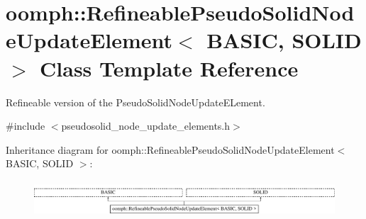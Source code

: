\hypertarget{classoomph_1_1RefineablePseudoSolidNodeUpdateElement}{}\section{oomph\+:\+:Refineable\+Pseudo\+Solid\+Node\+Update\+Element$<$ B\+A\+S\+IC, S\+O\+L\+ID $>$ Class Template Reference}
\label{classoomph_1_1RefineablePseudoSolidNodeUpdateElement}


Refineable version of the Pseudo\+Solid\+Node\+Update\+E\+Lement.  




{\ttfamily \#include $<$pseudosolid\+\_\+node\+\_\+update\+\_\+elements.\+h$>$}

Inheritance diagram for oomph\+:\+:Refineable\+Pseudo\+Solid\+Node\+Update\+Element$<$ B\+A\+S\+IC, S\+O\+L\+ID $>$\+:\begin{figure}[H]
\begin{center}
\leavevmode
\includegraphics[height=1.355932cm]{classoomph_1_1RefineablePseudoSolidNodeUpdateElement}
\end{center}
\end{figure}
